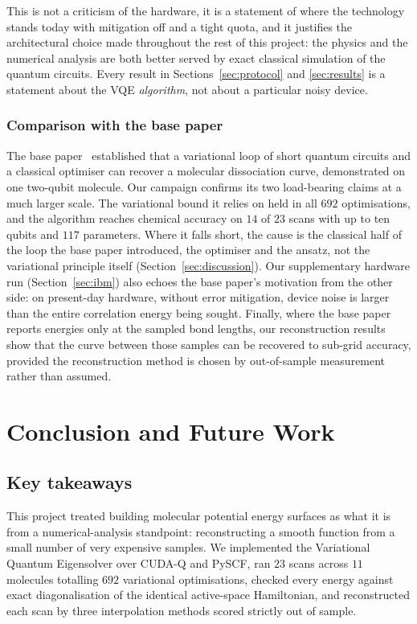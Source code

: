\documentclass[sigconf,screen,nonacm]{acmart}
\makeatletter
\newcommand{\@resetcolroom}{%
  \ifdim\pagetotal=\z@
    \ifx\@toplist\@empty\ifx\@botlist\@empty\ifx\@midlist\@empty
      \global\@colroom\@colht
      \global\vsize\@colht
    \fi\fi\fi
  \fi}
\let\@origFloatBarrier\FloatBarrier
\renewcommand{\FloatBarrier}{\@origFloatBarrier\@resetcolroom}
\makeatother
\begin{document}
This is not a criticism of the hardware, it is a statement of where the
technology stands today with mitigation off and a tight quota, and it
justifies the architectural choice made throughout the rest of this project:
the physics and the numerical analysis are both better served by exact
classical simulation of the quantum circuits. Every result in
Sections~\ref{sec:protocol} and \ref{sec:results} is a statement about the
VQE \emph{algorithm}, not about a particular noisy device.

\subsubsection{Comparison with the base paper}
\label{sec:comparison}

The base paper~\cite{peruzzo2014} established that a variational loop of
short quantum circuits and a classical optimiser can recover a molecular
dissociation curve, demonstrated on one two-qubit molecule. Our campaign
confirms its two load-bearing claims at a much larger scale. The variational
bound it relies on held in all $692$ optimisations, and the algorithm reaches
chemical accuracy on $14$ of $23$ scans with up to ten qubits and $117$
parameters. Where it falls short, the cause is the classical half of the loop
the base paper introduced, the optimiser and the ansatz, not the variational
principle itself (Section~\ref{sec:discussion}). Our supplementary hardware
run (Section~\ref{sec:ibm}) also echoes the base paper's motivation from the
other side: on present-day hardware, without error mitigation, device noise is
larger than the entire correlation energy being sought. Finally, where the
base paper reports energies only at the sampled bond lengths, our
reconstruction results show that the curve between those samples can be
recovered to sub-grid accuracy, provided the reconstruction method is chosen
by out-of-sample measurement rather than assumed.

\FloatBarrier
\FloatBarrier
\section{Conclusion and Future Work}
\label{sec:conclusion}

\subsection{Key takeaways}
This project treated building molecular potential energy surfaces as what it
is from a numerical-analysis standpoint: reconstructing a smooth function
from a small number of very expensive samples. We implemented the
Variational Quantum Eigensolver over CUDA-Q and PySCF, ran $23$ scans across
$11$ molecules totalling $692$ variational optimisations, checked every
energy against exact diagonalisation of the identical active-space
Hamiltonian, and reconstructed each scan by three interpolation methods
scored strictly out of sample.
\end{document}
